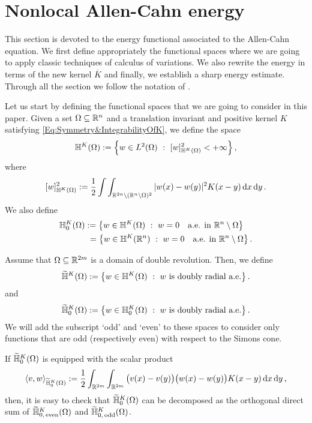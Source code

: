 \section{Nonlocal Allen-Cahn energy}
\label{Sec:Nonlocal_AllenCahn_Energy}




This section is devoted to the energy functional associated to the Allen-Cahn equation. We first define appropriately the functional spaces where we are going to apply classic techniques of calculus of variations. We also rewrite the energy in terms of the new kernel $\overline{K}$ and finally, we establish a sharp energy estimate. Through all the section we follow the notation of \cite{CozziPassalacqua}.



Let us start by defining the functional spaces that we are going to consider in this paper. Given a set $\Omega \subseteq \mathbb{R}^n$ and a translation invariant and positive kernel $K$ satisfying \eqref{Eq:Symmetry&IntegrabilityOfK}, we define the space
$$
\mathbb{H}^K(\Omega) := \left \{ w \in L^2(\Omega) \ : \ [w]^2_{\mathbb{H}^K(\Omega)} < + \infty \right \},
$$
where
$$
[w]^2_{\mathbb{H}^K(\Omega)} := \dfrac{1}{2}\int\int_{\mathbb{R}^{2n} \setminus (\mathbb{R}^n\setminus\Omega)^2} |w(x) - w(y)|^2 K(x-y) \,\mathrm{d} x \,\mathrm{d} y\,.
$$
We also define
\begin{align*}
	\mathbb{H}^K_0(\Omega) &:= \left \{ w \in \mathbb{H}^K(\Omega) \ : \  w = 0 \quad \textrm{a.e. in } \mathbb{R}^n \setminus \Omega \right \} \\
	&\ = \left \{ w \in \mathbb{H}^K(\mathbb{R}^n) \ : \  w = 0 \quad \textrm{a.e. in } \mathbb{R}^n \setminus \Omega \right \}.
\end{align*}

Assume that $\Omega \subseteq \mathbb{R}^{2m}$ is a domain of double revolution. Then, we define
$$
\widetilde{\mathbb{H}}^K(\Omega) := \left \{ w \in \mathbb{H}^K(\Omega) \ : \ w \textrm{ is doubly radial a.e.} \right \}.
$$
and
$$
\widetilde{\mathbb{H}}^K_0(\Omega) := \left \{ w \in \mathbb{H}^K_0(\Omega) \ : \ w \textrm{ is doubly radial a.e.} \right \}.
$$
We will add the subscript `odd' and `even' to these spaces to consider only functions that are odd (respectively even) with respect to the Simons cone.


\begin{remark}
\label{Remark:DecompositionHK}
If $\widetilde{\mathbb{H}}^K_0(\Omega)$ is equipped with the scalar product
$$
\langle v,w \rangle_{\widetilde{\mathbb{H}}^K_0(\Omega)} := \dfrac{1}{2}\int_{\mathbb{R}^{2m}} \int_{\mathbb{R}^{2m}}  \big(v(x) - v(y)\big)\big(w(x) - w(y)\big) K(x-y) \,\mathrm{d} x \,\mathrm{d} y\,,
$$
then, it is easy to check that $\widetilde{\mathbb{H}}^K_0(\Omega)$ can be decomposed as the orthogonal
direct sum of $\widetilde{\mathbb{H}}^K_{0,\, \mathrm{even}}(\Omega)$ and $\widetilde{\mathbb{H}}^K_{0,\,
\mathrm{odd}}(\Omega)$.
\end{remark}


